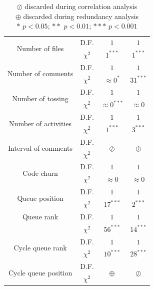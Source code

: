 \begin{sloppypar}
\begin{table}[t]
\begin{center}
\begin{tabular}{cccc}
			\multirow{2}{*}{Number of files} & 
			D.F. & 
			$1$ & 
			$1$
			\tabularnewline & 
			$\chi^2$ & 
			$1^{\ast\ast\ast}$ &  
			$1^{\ast\ast\ast}$ 
			\tabularnewline \hline 
			\multirow{2}{*}{Number of comments} & 
			D.F. & 
			$1$ &
			$1$ 
			\tabularnewline & 
			$\chi^2$ & 
			$\approx 0^{\ast}$ &  
			$31^{\ast\ast\ast}$  
			\tabularnewline \hline 
			\multirow{2}{*}{Number of tossing} & 
			D.F. & 
			$1$ &
			$1$  
			\tabularnewline & 
			$\chi^2$ & 
			$\approx 0^{\ast\ast\ast}$ &  
			$\approx 0$   
			\tabularnewline \hline 
			\multirow{2}{*}{Number of activities} & 
			D.F. & 
			$1$ &
			$1$  
			\tabularnewline & 
			$\chi^2$ & 
			$1^{\ast\ast\ast}$ &  
			$3^{\ast\ast\ast}$  
			\tabularnewline \hline 
			\multirow{2}{*}{Interval of comments} & 
			D.F. & 
			\multirow{2}{*}{$\oslash$} &
			\multirow{2}{*}{$\oslash$}  
			\tabularnewline &
			$\chi^2$ &
			&
			\tabularnewline \hline 
			\multirow{2}{*}{Code churn} & 
			D.F. & 
			$1$ & 
			$1$  
			\tabularnewline &
			$\chi^2$ &
			$\approx 0$ &  
			$\approx 0$ 
			\tabularnewline \hline 
			\multirow{2}{*}{Queue position} & 
			D.F. & 
			$1$ &             
			$1$
			\tabularnewline & 
			$\chi^2$ & 
			$17^{\ast\ast\ast}$ & 
			$2^{\ast\ast\ast}$
			\tabularnewline \hline 
			\multirow{1}{*}{Queue rank} & 
			D.F. & 
			$1$ & 
			$1$ 
			\tabularnewline &
			$\chi^2$ & 
			$56^{\ast\ast\ast}$ & 
			$14^{\ast\ast\ast}$
			\tabularnewline \hline 
			\multirow{2}{*}{Cycle queue rank} & 
			D.F. & 
			$1$ &
			$1$ 
			\tabularnewline &
			$\chi^2$ & 
			$10^{\ast\ast\ast}$ &
			$28^{\ast\ast\ast}$ 
			\tabularnewline \hline 
			\multirow{2}{*}{Cycle queue position} & 
			D.F. & 
			\multirow{2}{*}{$\oplus$} &
			\multirow{2}{*}{$\oslash$}  
			\tabularnewline &
			$\chi^2$ & 
			&
			\tabularnewline \hline 
		\end{tabular}
	\captionsetup{justification=centering}
	\caption*{
		$\oslash$ discarded during correlation analysis \\
		$\oplus$ discarded during redundancy analysis \\
		$\ast$ $p < 0.05$;
		$\ast\ast$ $p < 0.01$;
		$\ast\ast\ast$ $p < 0.001$\\ 
	}
	\end{center}
\end{table}


\end{sloppypar}

